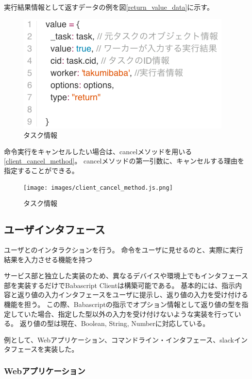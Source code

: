 実行結果情報として返すデータの例を図\ref{return_value_data}に示す。

\begin{figure}[htbp]
  \begin{center}
  \includegraphics[width=.6\linewidth,bb=0 0 408 225]{images/return_value_data.js.png}
  \end{center}
  \caption{タスク情報}
  \label{fig:return_value_data}
\end{figure}

命令実行をキャンセルしたい場合は、cancelメソッドを用いる\ref{client_cancel_method}。
cancelメソッドの第一引数に、キャンセルする理由を指定することができる。

\begin{figure}[htbp]
  \begin{center}
  \texttt{[image: images/client\_cancel\_method.js.png]}
  \end{center}
  \caption{タスク情報}
  \label{fig:client_cancel_method}
\end{figure}

\subsection{ユーザインタフェース}\label{ux30e6ux30fcux30b6ux30a4ux30f3ux30bfux30d5ux30a7ux30fcux30b9}

ユーザとのインタラクションを行う。
命令をユーザに見せるのと、実際に実行結果を入力させる機能を持つ

サービス部と独立した実装のため、異なるデバイスや環境上でもインタフェース部を実装するだけでBabascript
Clientは構築可能である。
基本的には、指示内容と返り値の入力インタフェースをユーザに提示し、返り値の入力を受け付ける機能を担う。
この際、Babascriptの指示でオプション情報として返り値の型を指定していた場合、指定した型以外の入力を受け付けないような実装を行っている。
返り値の型は現在、Boolean, String, Numberに対応している。

例として、Webアプリケーション、コマンドライン・インタフェース、slackインタフェースを実装した。

\subsubsection{Webアプリケーション}\label{webux30a2ux30d7ux30eaux30b1ux30fcux30b7ux30e7ux30f3}

